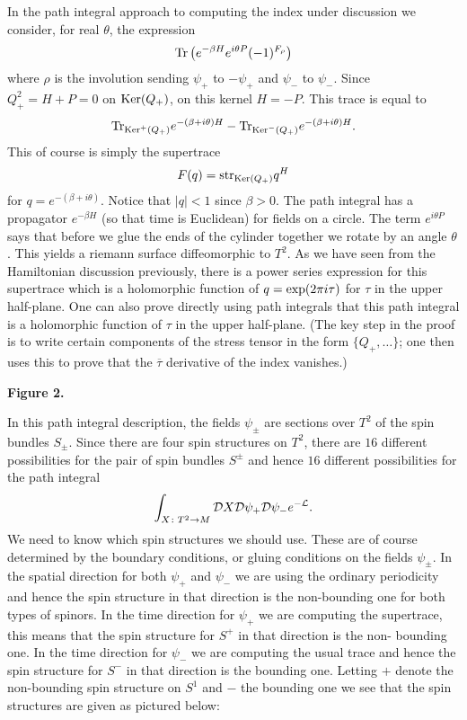 In the path integral approach to computing the index under discussion
we consider, for real $\theta$, the expression
$${\rm Tr}\left(e^{-\beta H}e^{i\theta P}(-1)^{F_\rho}\right)$$
where $\rho$ is the involution sending $\psi_+$ to $-\psi_+$ and
$\psi_-$ to $\psi_-$. Since $Q_+^2=H+P=0$ on ${\rm Ker}(Q_+)$, on this
kernel $H=-P$. This trace is equal to 
$${\rm Tr}_{{\rm Ker}^+(Q_+)}e^{-(\beta+i\theta)H}-{\rm Tr}_{{\rm
Ker}^-(Q_+)}e^{-(\beta+i\theta)H}.$$
This of course is simply the supertrace
$$F(q)={\rm str}_{{\rm Ker}(Q_+)}q^H$$
for $q=e^{-(\beta+i\theta)}$. 
Notice that $|q|<1$ since $\beta>0$.
The path integral has a propagator $e^{-\beta H}$ (so that time is
Euclidean) for fields on a circle. The term $e^{i\theta P}$ says that
before we glue the ends of the cylinder together we rotate by an angle
$\theta$.
This yields a riemann surface diffeomorphic to $T^2$.
As we have seen from the Hamiltonian discussion previously, there is
a power series expression for this supertrace which is a holomorphic
function of $q={\rm exp}(2\pi i\tau)$  for $\tau$ in the upper
half-plane.
One can also prove directly using path integrals that this path
integral is a holomorphic function of $\tau$ in the upper half-plane. 
(The key step in the proof is to write certain components of the stress
tensor in the form $\{Q_+,\dots\}$; one then uses this to prove
that the $\overline \tau$ derivative of the index vanishes.)

\centerline{\quad}
\centerline{\epsfxsize=1.5in}
\centerline{\bf Figure 2.}
\centerline{\quad}



In this path integral
description, the fields $\psi_\pm$ are sections over $T^2$ of
the spin bundles $S_\pm$. Since there are four spin structures on
$T^2$, there are $16$ different possibilities for the pair of spin
bundles $S^\pm$ and hence $16$ different possibilities for the path
integral
$$\int_{X\colon T^2\to M}{\cal D}X{\cal D}\psi_+{\cal D}\psi_-
e^{-{\cal L}}.$$ 
We need to know which spin structures we should use. These are of
course determined by the boundary conditions, or gluing conditions on
the fields $\psi_\pm$. In the spatial direction for both $\psi_+$ and
$\psi_-$ we are using the
ordinary periodicity and hence the spin structure in that direction is
the non-bounding one for both types of spinors.
In the time direction for $\psi_+$ we are computing the supertrace,
this means that the spin structure for $S^+$ in that direction is the
non- bounding one.
In the time direction for $\psi_-$ we are computing the usual trace
and hence the spin structure for $S^-$ in that direction is the
bounding one.
Letting $+$ denote the non-bounding spin structure on $S^1$ and $-$
the bounding one we see that the spin structures are given as pictured
below:

